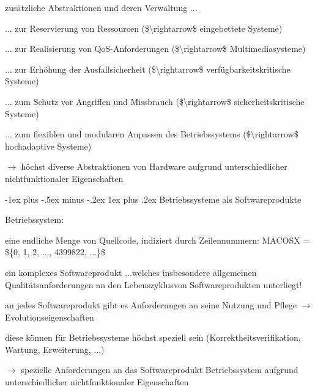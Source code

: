 \documentclass[a4paper]{article}
\makeatletter
\renewcommand{\subsubsection}{\@startsection{subsubsection}{3}{0mm}%
 {-1ex plus -.5ex minus -.2ex}%
 {1ex plus .2ex}%
 {\normalfont\small\bfseries}}
\makeatother
\begin{document}
\begin{multicols}{3}
    \begin{itemize*}
        \item
        zusätzliche Abstraktionen und deren Verwaltung ...
        \begin{itemize*}
            \item ... zur Reservierung von Ressourcen (\$\textbackslash rightarrow\$ eingebettete Systeme)
            \item ... zur Realisierung von QoS-Anforderungen (\$\textbackslash rightarrow\$ Multimediasysteme)
            \item ... zur Erhöhung der Ausfallsicherheit (\$\textbackslash rightarrow\$ verfügbarkeitskritische Systeme)
            \item ... zum Schutz vor Angriffen und Missbrauch (\$\textbackslash rightarrow\$ sicherheitskritische Systeme)
            \item ... zum flexiblen und modularen Anpassen des Betriebssystems (\$\textbackslash rightarrow\$ hochadaptive Systeme)
        \end{itemize*}
        \item
        $\rightarrow$  höchst diverse Abstraktionen von
        Hardware aufgrund unterschiedlicher nichtfunktionaler Eigenschaften
    \end{itemize*}


    \subsubsection{Betriebssysteme als
        Softwareprodukte}

    \begin{itemize*}
        \item
        Betriebssystem:
        \begin{itemize*}
            \item eine endliche Menge von Quellcode, indiziert durch Zeilennummern: MACOSX = \$\{0, 1, 2, ..., 4399822, ...\}\$
            \item ein komplexes Softwareprodukt ...welches insbesondere allgemeinen Qualitätsanforderungen an den Lebenszyklusvon Softwareprodukten unterliegt!
        \end{itemize*}
        \item
        an jedes Softwareprodukt gibt es Anforderungen an seine Nutzung und
        Pflege $\rightarrow$  Evolutionseigenschaften
        \item
        diese können für Betriebssysteme höchst speziell sein
        (Korrektheitsverifikation, Wartung, Erweiterung, ...)
        \item
        $\rightarrow$  spezielle Anforderungen an das
        Softwareprodukt Betriebssystem aufgrund unterschiedlicher
        nichtfunktionaler Eigenschaften
    \end{itemize*}



\end{multicols}
\end{document}
